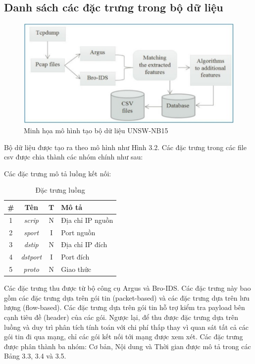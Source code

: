 \subsection{Danh sách các đặc trưng trong bộ dữ liệu}
\begin{figure}[H]
		\includegraphics[scale=0.5]{images/Chap3-Figure1} 
		\caption{Minh họa mô hình tạo bộ dữ liệu UNSW-NB15}
\end{figure}
Bộ dữ liệu được tạo ra theo mô hình như Hình 3.2. Các đặc trưng trong các file csv được chia thành các nhóm chính như sau:

Các đặc trưng mô tả luồng kết nối:

\begin{table}[H]
    \centering
    \begin{tabular}{|c|c|c|l|}
        \hline
        \textbf{\#}  & \textbf{Tên} & \textbf{T} & \textbf{Mô tả} \\
        \hline
        1 & \textit{scrip} & N & Địa chỉ IP nguồn \\
        \hline
        2 & \textit{sport} & I & Port nguồn\\
        \hline
        3 & \textit{dstip} & N & Địa chỉ IP đích \\
        \hline
        4 & \textit{dstport} & I & Port đích \\
        \hline
        5 & \textit{proto} & N & Giao thức \\
        \hline
    \end{tabular}
    \caption{Đặc trưng luồng}
    
\end{table}

Các đặc trưng thu được từ bộ công cụ Argus và Bro-IDS. Các đặc trưng này bao gồm các đặc trưng dựa trên gói tin (packet-based) và các đặc trưng dựa trên lưu lượng (flow-based). Các đặc trưng dựa trên gói tin hỗ trợ kiểm tra payload bên cạnh tiêu đề (header) của các gói. Ngược lại, để thu được đặc trưng dựa trên luồng và duy trì phân tích tính toán với chi phí thấp thay vì quan sát tất cả các gói tin đi qua mạng, chỉ các gói kết nối tới mạng được xem xét. Các đặc trưng được phân thành ba nhóm: Cơ bản, Nội dung và Thời gian được mô tả trong các Bảng 3.3, 3.4 và 3.5.

